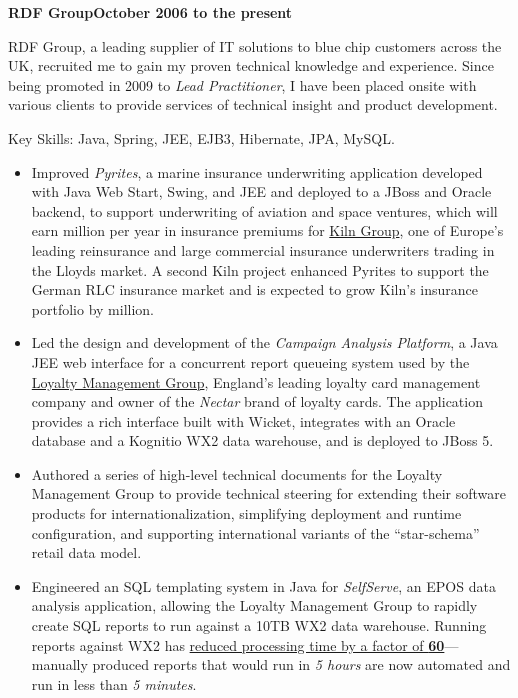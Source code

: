 \documentclass[a4paper,12pt]{article}
\newcommand{\head}[1]{\begin{center}{\large{\textbf{\sc{#1}}}}\nopagebreak\end{center}}
\newcommand{\jobheld}[2]{\textbf{#1\hfill #2}\nopagebreak}
\newcommand{\keyskills}[1]{\vspace{10pt}Key Skills: #1.}
\begin{document}
\head{Professional Experience}

\jobheld{RDF Group}{October 2006 to the present}

RDF Group, a leading supplier of IT solutions to blue chip customers across the UK, recruited me to gain my proven technical knowledge and experience.  Since being promoted in 2009 to \emph{Lead Practitioner}, I have been placed onsite with various clients to provide services of technical insight and product development.

\keyskills{Java, Spring, JEE, EJB3, Hibernate, JPA, MySQL}

\begin{itemize}

\item Improved \emph{Pyrites}, a marine insurance underwriting application developed with Java Web Start, Swing, and JEE and deployed to a JBoss and Oracle backend, to support underwriting of aviation and space ventures, which will earn  million per year in insurance premiums for \href{http://www.kilngroup.com/}{Kiln Group}, one of Europe's leading reinsurance and large commercial insurance underwriters trading in the Lloyds market.  A second Kiln project enhanced Pyrites to support the German RLC insurance market and is expected to grow  Kiln's insurance portfolio by  million.

\item Led the design and development of the \emph{Campaign Analysis Platform}, a Java JEE web interface for a concurrent report queueing system used by the \href{http://www.loyalty.co.uk/}{Loyalty Management Group}, England's leading loyalty card management company and owner of the \emph{Nectar} brand of loyalty cards.  The application provides a rich interface built with Wicket, integrates with an Oracle database and a Kognitio WX2 data warehouse, and is deployed to JBoss 5.

\item Authored a series of high-level technical documents for the Loyalty Management Group to provide technical steering for extending their software products for internationalization, simplifying deployment and runtime configuration, and supporting international variants of the ``star-schema'' retail data model.

\item Engineered an SQL templating system in Java for \emph{SelfServe}, an EPOS data analysis application, allowing the Loyalty Management Group to rapidly create SQL reports to run against a 10TB WX2 data warehouse.  Running reports against WX2 has \href{http://www.kognitio.com/casestudies/casestudy_lmg.php}{reduced processing time by a factor of \textbf{60}}---manually produced reports that would run in \emph{5 hours} are now automated and run in less than \emph{5 minutes}.


\end{itemize}
\end{document}
